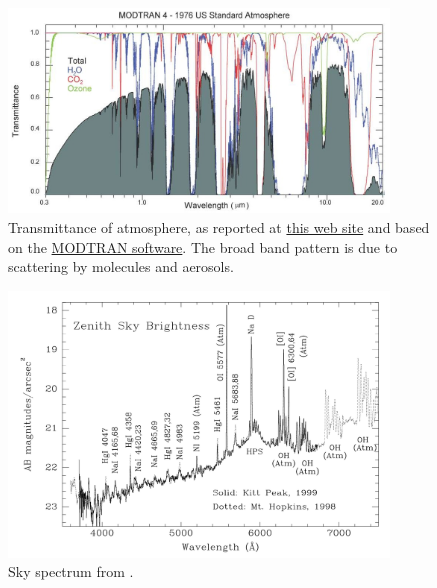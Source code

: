 
  

\begin{figure}
\includegraphics[width=0.9\textwidth]{figures/modtran.jpg}
\caption{\label{fig:absorption} Transmittance of atmosphere, as
reported at
\href{http://what-when-how.com/remote-sensing-from-air-and-space/atmospheric-absorption-scattering-and-turbulence-visible-imagery-remote-sensing/}{this
web site} and based on the \href{http://modtran.spectral.com/}{MODTRAN
software}. The broad band pattern is due to scattering by molecules
and aerosols.}
\end{figure}

\begin{figure}
\includegraphics[width=0.9\textwidth]{figures/massey00a.png}
\caption{\label{fig:emission} Sky spectrum from \citet{massey00a}.}
\end{figure}

